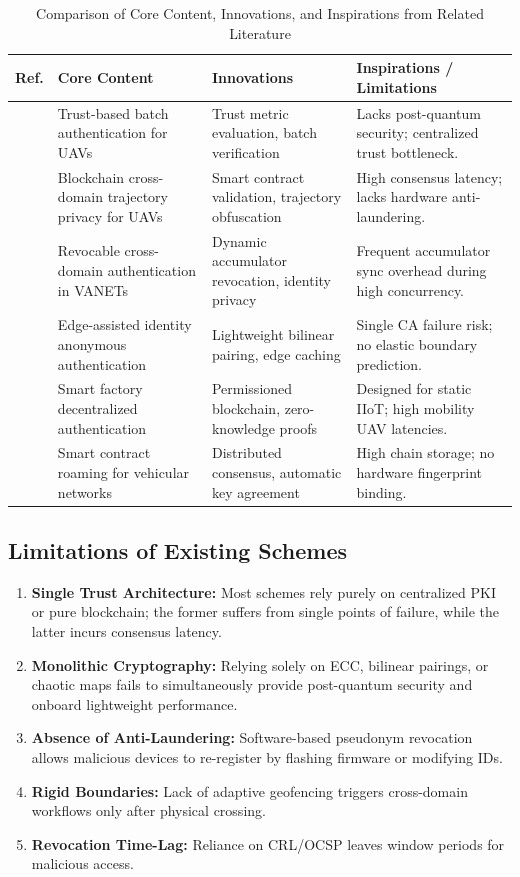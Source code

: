 \documentclass[lettersize,journal]{IEEEtran}
\begin{document}
\begin{table}[!t]
\caption{Comparison of Core Content, Innovations, and Inspirations from Related Literature\label{tab:related_work}}
\centering
\begin{tabular}{|c|p{4.5cm}|p{5cm}|p{5cm}|}
\hline
\textbf{Ref.} & \textbf{Core Content} & \textbf{Innovations} & \textbf{Inspirations / Limitations} \\
\hline
\cite{ref1} & Trust-based batch authentication for UAVs & Trust metric evaluation, batch verification & Lacks post-quantum security; centralized trust bottleneck. \\
\hline
\cite{ref2} & Blockchain cross-domain trajectory privacy for UAVs & Smart contract validation, trajectory obfuscation & High consensus latency; lacks hardware anti-laundering. \\
\hline
\cite{ref3} & Revocable cross-domain authentication in VANETs & Dynamic accumulator revocation, identity privacy & Frequent accumulator sync overhead during high concurrency. \\
\hline
\cite{ref4} & Edge-assisted identity anonymous authentication & Lightweight bilinear pairing, edge caching & Single CA failure risk; no elastic boundary prediction. \\
\hline
\cite{ref5} & Smart factory decentralized authentication & Permissioned blockchain, zero-knowledge proofs & Designed for static IIoT; high mobility UAV latencies. \\
\hline
\cite{ref6} & Smart contract roaming for vehicular networks & Distributed consensus, automatic key agreement & High chain storage; no hardware fingerprint binding. \\
\hline
\end{tabular}
\end{table}
\subsection{Limitations of Existing Schemes}
\begin{enumerate}
    \item \textbf{Single Trust Architecture:} Most schemes rely purely on centralized PKI or pure blockchain; the former suffers from single points of failure, while the latter incurs consensus latency.
    \item \textbf{Monolithic Cryptography:} Relying solely on ECC, bilinear pairings, or chaotic maps fails to simultaneously provide post-quantum security and onboard lightweight performance.
    \item \textbf{Absence of Anti-Laundering:} Software-based pseudonym revocation allows malicious devices to re-register by flashing firmware or modifying IDs.
    \item \textbf{Rigid Boundaries:} Lack of adaptive geofencing triggers cross-domain workflows only after physical crossing.
    \item \textbf{Revocation Time-Lag:} Reliance on CRL/OCSP leaves window periods for malicious access.
\end{enumerate}
\end{document}
